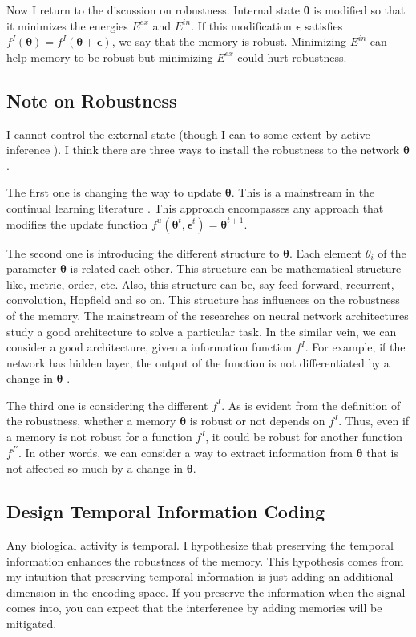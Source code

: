 \documentclass[12pt]{article}
\begin{document}
 Now I return to the discussion on robustness. Internal state $\bm{\theta}$ is modified so that it minimizes the 
 energies $E^{ex}$ and $E^{in}$. If this modification $\bm{\epsilon}$ satisfies $f^I(\bm{\theta}) = f^I(\bm{\theta}+ \bm{\epsilon})$, 
 we say that the memory is robust. Minimizing $E^{in}$ can help memory to be robust but minimizing $E^{ex}$ could 
 hurt robustness.

 \subsection{Note on Robustness}
 I cannot control the external state (though I can to some extent by active inference \cite{Friston10}). 
 I think there are three ways to install the robustness to the network $\bm{\theta}$. 
 
 The first one is changing the way to update $\bm{\theta}$. This is a mainstream in the continual learning literature \cite{Kirkpatrick17,Shin17}. 
 This approach encompasses any approach that modifies the update function $f^u(\bm{\theta}^t, \bm{\epsilon}^t) = \bm{\theta}^{t + 1}$.

 The second one is introducing the different structure to $\bm{\theta}$. Each element $\theta_i$ of the parameter $\bm{\theta}$ is related each other. 
 This structure can  be mathematical structure like, metric, order, etc. Also, this structure can be, say 
 feed forward, recurrent, convolution, Hopfield and so on. This structure has influences on the robustness of 
 the memory. The mainstream of the researches on neural network architectures study a good architecture to solve 
 a particular task. In the similar vein, we can consider a good architecture, given a information function $f^I$. 
 For example, if the network has hidden layer, the output of the function is not differentiated by a change in $\bm{\theta}$ \cite{Watanabe09,Amari06}.

 The third one is considering the different $f^I$. As is evident from the definition of the robustness, whether a memory $\bm{\theta}$ 
 is robust or not depends on $f^I$. Thus, even if a memory is not robust for a function $f^I$, it could be robust for another 
 function $f^{I'}$. In other words, we can consider a way to extract information from $\bm{\theta}$ that is not affected so much by 
 a change in $\bm{\theta}$.

 \subsection{Design Temporal Information Coding}
 Any biological activity is temporal. I hypothesize that preserving the temporal information enhances the robustness 
 of the memory. This hypothesis comes from my intuition that preserving temporal information is just adding an additional 
 dimension in the encoding space. If you preserve the information when the signal comes into, you can expect 
 that the interference by adding memories will be mitigated. 
\end{document}
